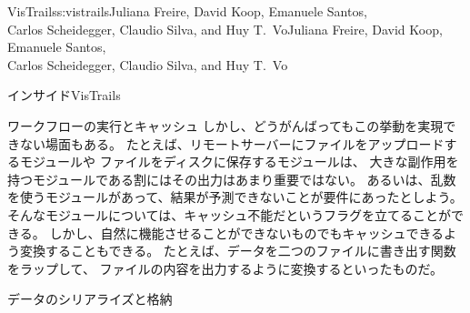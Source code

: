 \begin{aosachaptertoc}{VisTrails}{s:vistrails}{Juliana Freire, David Koop, Emanuele Santos, \\ Carlos Scheidegger, Claudio Silva, and Huy T.\ Vo}{Juliana Freire, David Koop, Emanuele Santos, \\ \hspace*{0.9cm} Carlos Scheidegger, Claudio Silva, and Huy T.\ Vo}
\begin{aosasect1}{インサイドVisTrails}
\begin{aosasect2}{ワークフローの実行とキャッシュ}
しかし、どうがんばってもこの挙動を実現できない場面もある。
たとえば、リモートサーバーにファイルをアップロードするモジュールや
ファイルをディスクに保存するモジュールは、
大きな副作用を持つモジュールである割にはその出力はあまり重要ではない。
あるいは、乱数を使うモジュールがあって、結果が予測できないことが要件にあったとしよう。
そんなモジュールについては、キャッシュ不能だというフラグを立てることができる。
しかし、自然に機能させることができないものでもキャッシュできるよう変換することもできる。
たとえば、データを二つのファイルに書き出す関数をラップして、
ファイルの内容を出力するように変換するといったものだ。

\end{aosasect2}

\begin{aosasect2}{データのシリアライズと格納}


\end{aosasect2}
\end{aosasect1}
\end{aosachaptertoc}

